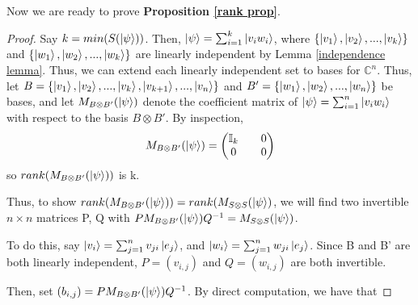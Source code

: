 \bigskip
Now we are ready to prove \textbf{Proposition \ref{rank prop}}.

\begin{proof}
Say $k=min(S(\ket{\psi}))$. Then, $\ket{\psi}=\sum_{i=1}^k \ket{v_i w_i}$, where $\{\ket{v_1}, \ket{v_2},...,\ket{v_k}\}$ and $\{\ket{w_1}, \ket{w_2},...,\ket{w_k}\}$ are linearly independent by Lemma \ref{independence lemma}.  Thus, we can extend each linearly independent set to bases for $\mathbb{C}^n$. Thus, let $B=\{\ket{v_1}, \ket{v_2},...,\ket{v_k}, \ket{v_{k+1}},...,\ket{v_n}\}$ and $B'=\{\ket{w_1}, \ket{w_2},...,\ket{w_n}\}$ be bases, and let $M_{B \otimes B'}(\ket{\psi})$ denote the coefficient matrix of $\ket{\psi}=\sum_{i=1}^{n}\ket{v_i w_i}$ with respect to the basis $B \otimes B'$. By inspection, 
$$M_{B \otimes B'}(\ket{\psi})=\begin{pmatrix}
\mathbb{I}_k && 0 \\
0 && 0
\end{pmatrix}$$
so $rank(M_{B \otimes B'}(\ket{\psi}))$ is k.

Thus, to show $rank(M_{B \otimes B'}(\ket{\psi}))=rank(M_{S \otimes S}(\ket{\psi})$, we will find two invertible $n \times n$ matrices P, Q with $PM_{B \otimes B'}(\ket{\psi})Q^{-1}=M_{S \otimes S}(\ket{\psi})$.

To do this, say $\ket{v_i}=\sum_{j=1}^n v_{ji}\ket{e_j}$, and
$\ket{w_i}=\sum_{j=1}^n w_{ji}\ket{e_j}$.  Since B and B' are both linearly independent, $P=(v_{i,j})$ and $Q=(w_{i,j})$ are both invertible.


Then, set $(b_{i,j})=PM_{B \otimes B'}(\ket{\psi})Q^{-1}$.  By direct computation, we have that
\begin{comment}


\end{comment}
\end{proof}
